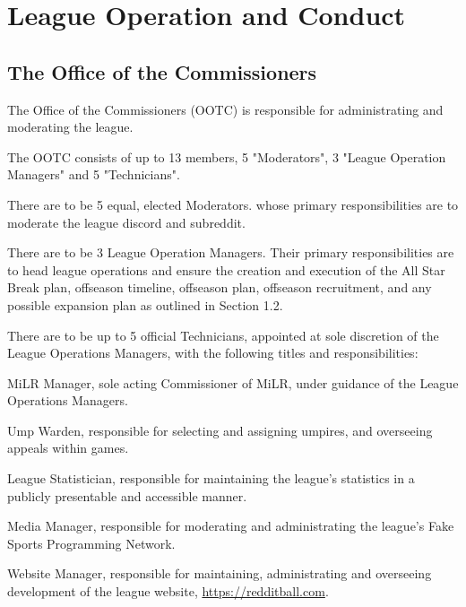 
\section{League Operation and Conduct}

\subsection{The Office of the Commissioners}
\begin{deepEnumerate}
	\item The Office of the Commissioners (OOTC) is responsible for administrating and moderating the league.
	\item The OOTC consists of up to 13 members, 5 "Moderators", 3 "League Operation Managers" and 5 "Technicians".
	\begin{deepEnumerate}
		\item There are to be 5 equal, elected Moderators. whose primary responsibilities are to moderate the league discord and subreddit.
		\item There are to be 3 League Operation Managers. Their primary responsibilities are to head league operations
		and ensure the creation and execution of the All Star Break plan, offseason timeline, offseason plan, offseason recruitment, and any possible expansion plan 
		as outlined in Section 1.2.
		\item There are to be up to 5 official Technicians, appointed at sole discretion of the League Operations Managers, with the following titles and responsibilities:
		\begin{deepEnumerate}
			\item MiLR Manager, sole acting Commissioner of MiLR, under guidance of the League Operations Managers.
			\item Ump Warden, responsible for selecting and assigning umpires, and overseeing appeals within games.
			\item League Statistician, responsible for maintaining the league's statistics in a publicly presentable and accessible manner.
			\item Media Manager, responsible for moderating and administrating the league's Fake Sports Programming Network.
			\item Website Manager, responsible for maintaining, administrating and overseeing development of the league website, \url{https://redditball.com}.
		\end{deepEnumerate}

\end{deepEnumerate}
\end{deepEnumerate}
